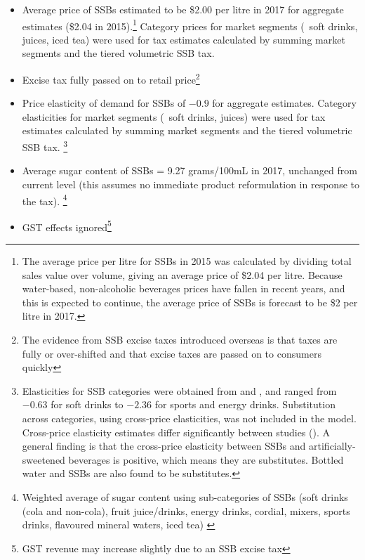 \documentclass[embargoed]{grattan}
\begin{document}
\begin{itemize}
\item
  Average price of SSBs estimated to be \$2.00 per litre in 2017 for aggregate estimates (\$2.04 in 2015).\footnote{The average price per litre for SSBs in 2015 was calculated by dividing total sales value over volume, giving an average price of \$2.04 per litre.
Because water-based, non-alcoholic beverages prices have fallen in recent years, and this is expected to continue, the average price of SSBs is forecast to be \$2 per litre in 2017.} Category prices for market segments (\eg~soft drinks, juices, iced tea) were used for tax estimates calculated by summing market segments and the tiered volumetric SSB tax.
\item
  Excise tax fully passed on to retail price\footnote{The evidence from SSB excise taxes introduced overseas is that taxes are fully or over-shifted and that excise taxes are passed on to consumers quickly}
\item
  Price elasticity of demand for SSBs of \(-0.9\) for aggregate estimates.
Category elasticities for market segments (\eg~soft drinks, juices) were used for tax estimates calculated by summing market segments and the tiered volumetric SSB tax.%
\footnote{Elasticities for SSB categories were obtained from \textcite{Sharma2014effectstaxingsugarsweetened} and \textcite{Zhen2014Predictingeffectssugar}, and ranged from \(-0.63\) for soft drinks to \(-2.36\) for sports and energy drinks.
Substitution across categories, using cross-price elasticities, was not included in the model.
Cross-price elasticity estimates differ significantly between studies (\textcite{Organization2016FiscalPoliciesDiet}).
A general finding is that the cross-price elasticity between SSBs and artificially-sweetened beverages is positive, which means they are substitutes.
Bottled water and SSBs are also found to be substitutes.}
\item
  Average sugar content of SSBs = 9.27 grams/100mL in 2017, unchanged from current level (this assumes no immediate product reformulation in response to the tax).%
\footnote{Weighted average of sugar content using sub-categories of SSBs (soft drinks (cola and non-cola), fruit juice/drinks, energy drinks, cordial, mixers, sports drinks, flavoured mineral waters, iced tea) \textcites{rethinksugarydrink2016Howmuchsugar}{HealthCth2014FactSheetHow}} 
\item
  GST effects ignored\footnote{GST revenue may increase slightly due to an SSB excise tax}
\end{itemize}
\end{document}
